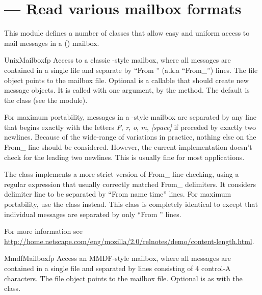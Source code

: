 \section{ ---
         Read various mailbox formats}



This module defines a number of classes that allow easy and uniform
access to mail messages in a (\UNIX{}) mailbox.

\begin{classdesc}{UnixMailbox}{fp}
Access to a classic \UNIX{}-style mailbox, where all messages are
contained in a single file and separate by ``From '' (a.k.a ``From_'')
lines.  The file object  points to the mailbox file.  Optional
 is a callable that should create new message objects.
It is called with one argument,  by the 
method.  The default is the  class (see the
 module).

For maximum portability, messages in a \UNIX{}-style mailbox are
separated by any line that begins exactly with the letters \emph{F},
\emph{r}, \emph{o}, \emph{m}, \emph{[space]} if preceded by exactly two
newlines.  Because of the wide-range of variations in practice,
nothing else on the From_ line should be considered.  However, the
current implementation doesn't check for the leading two newlines.
This is usually fine for most applications.

The  class implements a more strict version of
From_ line checking, using a regular expression that usually correctly
matched From_ delimiters.  It considers delimiter line to be separated
by ``From name time'' lines.  For maximum portability, use the
 class instead.  This
class is completely identical to  except that
individual messages are separated by only ``From '' lines.

For more
information see
\url{http://home.netscape.com/eng/mozilla/2.0/relnotes/demo/content-length.html}.
\end{classdesc}

\begin{classdesc}{MmdfMailbox}{fp}
Access an MMDF-style mailbox, where all messages are contained
in a single file and separated by lines consisting of 4 control-A
characters.  The file object  points to the mailbox file.
Optional  is as with the  class.
\end{classdesc}

